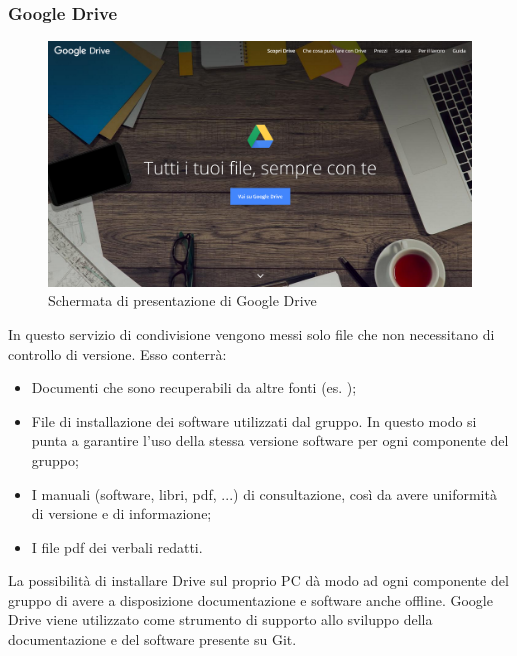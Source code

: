 \documentclass[../NormeDiProgetto.tex]{subfiles}
\begin{document}
			\subsubsection{Google Drive}
			\begin{figure} [h!]
				\centering
				\includegraphics[scale=0.2]{./Immagini/Drive.png}
				\caption{Schermata di presentazione di Google Drive}\label{}
			\end{figure}
				In questo servizio di condivisione vengono messi solo file che non necessitano di
				controllo di versione.
				Esso conterrà:
				\begin{itemize}
					\item Documenti che sono recuperabili da altre fonti (es. );
					\item File di installazione dei software utilizzati dal gruppo.
					In questo modo si punta a garantire l'uso della stessa versione software per ogni
					componente del gruppo;
					\item I manuali (software, libri, pdf, ...) di consultazione, così da avere
					uniformità di versione e di informazione;
					\item I file pdf dei verbali redatti.
				\end{itemize}
				La possibilità di installare Drive sul proprio PC dà modo ad ogni componente del gruppo di
				avere a disposizione documentazione e software anche offline.
				Google Drive viene utilizzato come strumento di supporto allo sviluppo della
				documentazione e del software presente su Git.
\end{document}
